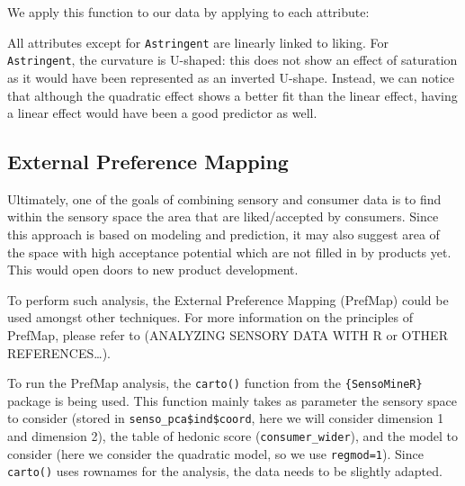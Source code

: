 \documentclass[
]{book}
\newenvironment{Shaded}{\begin{snugshade}}{\end{snugshade}}
\newcommand{\AttributeTok}[1]{\textcolor[rgb]{0.77,0.63,0.00}{#1}}
\newcommand{\ControlFlowTok}[1]{\textcolor[rgb]{0.13,0.29,0.53}{\textbf{#1}}}
\newcommand{\FunctionTok}[1]{\textcolor[rgb]{0.00,0.00,0.00}{#1}}
\newcommand{\NormalTok}[1]{#1}
\newcommand{\OtherTok}[1]{\textcolor[rgb]{0.56,0.35,0.01}{#1}}
\newcommand{\SpecialCharTok}[1]{\textcolor[rgb]{0.00,0.00,0.00}{#1}}
\begin{document}
We apply this function to our data by applying to each attribute:

\begin{Shaded}
\end{Shaded}

All attributes except for \texttt{Astringent} are linearly linked to liking.
For \texttt{Astringent}, the curvature is U-shaped: this does not show an effect of saturation as it would have been represented as an inverted U-shape. Instead, we can notice that although the quadratic effect shows a better fit than the linear effect, having a linear effect would have been a good predictor as well.

\hypertarget{external-preference-mapping}{%
\subsection{External Preference Mapping}\label{external-preference-mapping}}

Ultimately, one of the goals of combining sensory and consumer data is to find within the sensory space the area that are liked/accepted by consumers. Since this approach is based on modeling and prediction, it may also suggest area of the space with high acceptance potential which are not filled in by products yet. This would open doors to new product development.

To perform such analysis, the External Preference Mapping (PrefMap) could be used amongst other techniques. For more information on the principles of PrefMap, please refer to (ANALYZING SENSORY DATA WITH R or OTHER REFERENCES\ldots).

To run the PrefMap analysis, the \texttt{carto()} function from the \texttt{\{SensoMineR\}} package is being used. This function mainly takes as parameter the sensory space to consider (stored in \texttt{senso\_pca\$ind\$coord}, here we will consider dimension 1 and dimension 2), the table of hedonic score (\texttt{consumer\_wider}), and the model to consider (here we consider the quadratic model, so we use \texttt{regmod=1}). Since \texttt{carto()} uses rownames for the analysis, the data needs to be slightly adapted.
\end{document}
